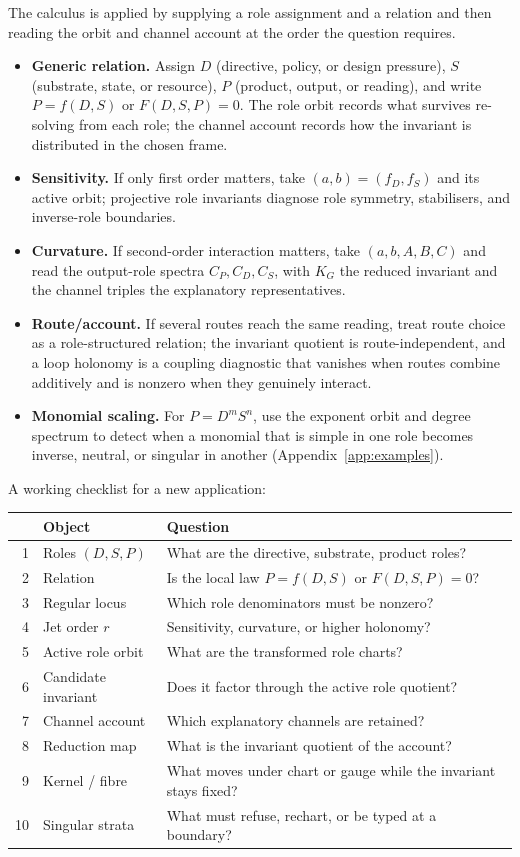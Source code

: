\documentclass[11pt]{article}
\theoremstyle{plain}
\theoremstyle{definition}
\newcommand{\KG}{K_{G}}
\begin{document}
The calculus is applied by supplying a role assignment and a relation and then reading the orbit and
channel account at the order the question requires.
\begin{itemize}[itemsep=2pt,topsep=2pt]
\item \textbf{Generic relation.} Assign $D$ (directive, policy, or design pressure), $S$ (substrate,
state, or resource), $P$ (product, output, or reading), and write $P=f(D,S)$ or $F(D,S,P)=0$. The role
orbit records what survives re-solving from each role; the channel account records how the invariant
is distributed in the chosen frame.
\item \textbf{Sensitivity.} If only first order matters, take $(a,b)=(f_D,f_S)$ and its active orbit;
projective role invariants diagnose role symmetry, stabilisers, and inverse-role boundaries.
\item \textbf{Curvature.} If second-order interaction matters, take $(a,b,A,B,C)$ and read the
output-role spectra $C_P,C_D,C_S$, with $\KG$ the reduced invariant and the channel triples the
explanatory representatives.
\item \textbf{Route/account.} If several routes reach the same reading, treat route choice as a
role-structured relation; the invariant quotient is route-independent, and a loop holonomy is a
coupling diagnostic that vanishes when routes combine additively and is nonzero when they genuinely
interact.
\item \textbf{Monomial scaling.} For $P=D^mS^n$, use the exponent orbit and degree spectrum to detect
when a monomial that is simple in one role becomes inverse, neutral, or singular in another
(Appendix~\ref{app:examples}).
\end{itemize}

\noindent A working checklist for a new application:
\begin{center}
\small
\begin{tabular}{r l l}
\hline
& Object & Question\\
\hline
1 & Roles $(D,S,P)$ & What are the directive, substrate, product roles?\\
2 & Relation & Is the local law $P=f(D,S)$ or $F(D,S,P)=0$?\\
3 & Regular locus & Which role denominators must be nonzero?\\
4 & Jet order $r$ & Sensitivity, curvature, or higher holonomy?\\
5 & Active role orbit & What are the transformed role charts?\\
6 & Candidate invariant & Does it factor through the active role quotient?\\
7 & Channel account & Which explanatory channels are retained?\\
8 & Reduction map & What is the invariant quotient of the account?\\
9 & Kernel / fibre & What moves under chart or gauge while the invariant stays fixed?\\
10 & Singular strata & What must refuse, rechart, or be typed at a boundary?\\
\hline
\end{tabular}
\end{center}
\end{document}
